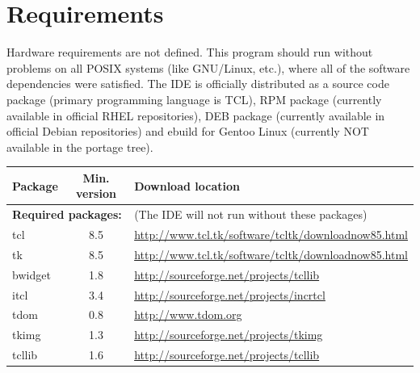 \documentclass[a4paper,twoside,12pt]{book}
\newcommand{\mysmallfont}{\fontsize{8pt}{10pt} \selectfont{}}
\begin{document}
	\section*{Requirements}
		Hardware requirements are not defined. This program should run without problems on all POSIX systems (like GNU/Linux, etc.), where all of the software dependencies were satisfied. The IDE is officially distributed as a source code package (primary programming language is TCL), RPM package (currently available in official RHEL repositories), DEB package (currently available in official Debian repositories) and ebuild for Gentoo Linux (currently NOT available in the portage tree).
		\begin{table}[h]
			\centering{}
			\mysmallfont{}
			\begin{tabular}{|l|c|l|}
				\hline
				\textbf{Package}	& \textbf{Min. version}	& \textbf{Download location}			\\\hline
				\multicolumn{2}{|l}{\textbf{Required packages:}}
					& (The IDE will not run without these packages)						\\\hline
				tcl		& 8.5		& \url{http://www.tcl.tk/software/tcltk/downloadnow85.html}	\\\hline
				tk		& 8.5		& \url{http://www.tcl.tk/software/tcltk/downloadnow85.html}	\\\hline
				bwidget		& 1.8		& \url{http://sourceforge.net/projects/tcllib}			\\\hline
				itcl		& 3.4		& \url{http://sourceforge.net/projects/incrtcl}			\\\hline
				tdom		& 0.8		& \url{http://www.tdom.org}					\\\hline
				tkimg		& 1.3		& \url{http://sourceforge.net/projects/tkimg}			\\\hline
				tcllib		& 1.6		& \url{http://sourceforge.net/projects/tcllib}			\\\hline


\end{tabular}
\end{table}
\end{document}
